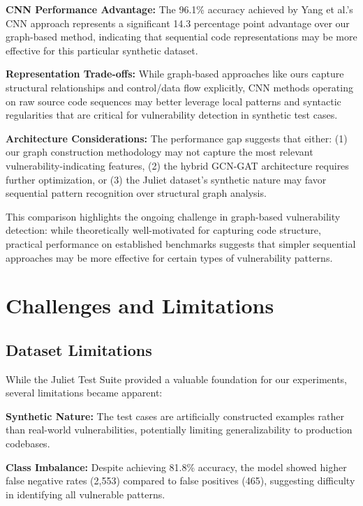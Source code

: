 \textbf{CNN Performance Advantage:} The 96.1\% accuracy achieved by Yang et al.'s CNN approach \cite{yang2022cnn} represents a significant 14.3 percentage point advantage over our graph-based method, indicating that sequential code representations may be more effective for this particular synthetic dataset.

\textbf{Representation Trade-offs:} While graph-based approaches like ours capture structural relationships and control/data flow explicitly, CNN methods operating on raw source code sequences may better leverage local patterns and syntactic regularities that are critical for vulnerability detection in synthetic test cases.

\textbf{Architecture Considerations:} The performance gap suggests that either: (1) our graph construction methodology may not capture the most relevant vulnerability-indicating features, (2) the hybrid GCN-GAT architecture requires further optimization, or (3) the Juliet dataset's synthetic nature may favor sequential pattern recognition over structural graph analysis.

This comparison highlights the ongoing challenge in graph-based vulnerability detection: while theoretically well-motivated for capturing code structure, practical performance on established benchmarks suggests that simpler sequential approaches may be more effective for certain types of vulnerability patterns.

\section{Challenges and Limitations}

\subsection{Dataset Limitations}

While the Juliet Test Suite provided a valuable foundation for our experiments, several limitations became apparent:

\textbf{Synthetic Nature:} The test cases are artificially constructed examples rather than real-world vulnerabilities, potentially limiting generalizability to production codebases.

\textbf{Class Imbalance:} Despite achieving 81.8\% accuracy, the model showed higher false negative rates (2,553) compared to false positives (465), suggesting difficulty in identifying all vulnerable patterns.

